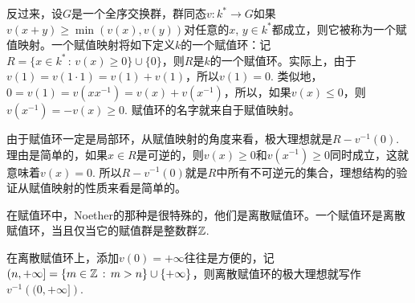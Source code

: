 \para 反过来，设$G$是一个全序交换群，群同态$v:k^*\to G$如果$v(x+y)\geq \min\left(v(x),v(y)\right)$对任意的$x$, $y\in k^*$都成立，则它被称为一个赋值映射。一个赋值映射将如下定义$k$的一个赋值环：记$R=\{x\in k^* \,:\, v(x)\geq 0\}\cup \{0\}$，则$R$是$k$的一个赋值环。实际上，由于$v(1)=v(1\cdot 1)=v(1)+v(1)$，所以$v(1)=0$. 类似地，$0=v(1)=v(xx^{-1})=v(x)+v(x^{-1})$，所以，如果$v(x)\leq 0$，则$v(x^{-1})=-v(x)\geq 0$. 赋值环的名字就来自于赋值映射。

由于赋值环一定是局部环，从赋值映射的角度来看，极大理想就是$R-v^{-1}(0)$. 理由是简单的，如果$x\in R$是可逆的，则$v(x)\geq 0$和$v(x^{-1})\geq 0$同时成立，这就意味着$v(x)=0$. 所以$R-v^{-1}(0)$就是$R$中所有不可逆元的集合，理想结构的验证从赋值映射的性质来看是简单的。

\begin{pro}
在赋值环中，Noether的那种是很特殊的，他们是离散赋值环。一个赋值环是离散赋值环，当且仅当它的赋值群是整数群$\mathbb{Z}$. 
\end{pro}

在离散赋值环上，添加$v(0)=+\infty$往往是方便的，记$(n,+\infty]=\{m\in \mathbb{Z}\,:\, m>n\}\cup \{+\infty\}$，则离散赋值环的极大理想就写作$v^{-1}\left((0,+\infty]\right)$. 

